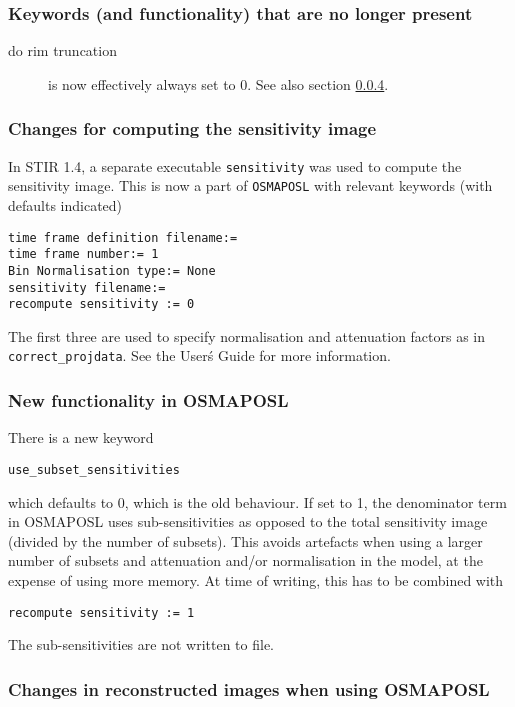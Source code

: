 \documentclass{article}
\begin{document}
\subsubsection{Keywords (and functionality) that are no longer present}
\begin{description}
\item[do rim truncation] is now effectively always set to 0. See also
section \ref{sec:changes_in_OSMAPOSL_images}.
\end{description}

\subsubsection{Changes for computing the sensitivity image}
In STIR 1.4, a separate executable \texttt{sensitivity} was used to compute
the sensitivity image. This is now a part of \texttt{OSMAPOSL} with 
relevant keywords (with defaults indicated)
\begin{verbatim}
time frame definition filename:=
time frame number:= 1
Bin Normalisation type:= None
sensitivity filename:=
recompute sensitivity := 0
\end{verbatim}
The first three are used to specify normalisation and attenuation factors 
as in \texttt{correct\_projdata}. 
See the User\'s Guide for more information.

\subsubsection{New functionality in OSMAPOSL}
There is a new keyword
\begin{verbatim}
use_subset_sensitivities
\end{verbatim}
which defaults to 0, which is the old behaviour. If set to 1, the denominator
term in OSMAPOSL uses sub-sensitivities as opposed to the total sensitivity image
(divided by the number of subsets). This avoids artefacts when using a larger
number of subsets and attenuation and/or normalisation in the model, at the 
expense of using more memory.
At time of writing, this has to be combined with
\begin{verbatim}
recompute sensitivity := 1 
\end{verbatim} 
The sub-sensitivities are not written to file.

\subsubsection{Changes in reconstructed images when using OSMAPOSL}
\label{sec:changes_in_OSMAPOSL_images}
\end{document}
